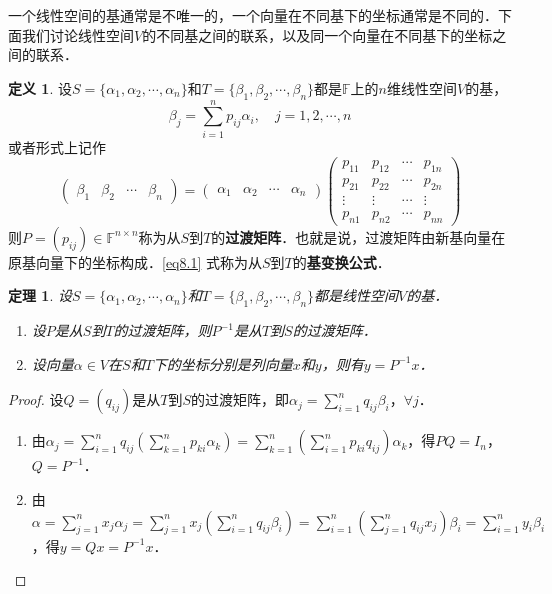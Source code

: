 \documentclass[a4paper,fontset=windows]{ctexbook}
\newtheorem{theorem}{定理}[chapter]
\theoremstyle{definition}
\newtheorem{definition}{定义}[chapter]
\begin{document}
一个线性空间的基通常是不唯一的，一个向量在不同基下的坐标通常是不同的．下面我们讨论线性空间$V$的不同基之间的联系，以及同一个向量在不同基下的坐标之间的联系．

\begin{definition}
设$S=\{\alpha_1,\alpha_2,\cdots,\alpha_n\}$和$T=\{\beta_1,\beta_2,\cdots,\beta_n\}$都是$\mathbb{F}$上的$n$维线性空间$V$的基，
$$\beta_j=\sum_{i=1}^np_{ij}\alpha_i,\quad j=1,2,\cdots,n$$
或者形式上记作
\begin{equation}\label{eq8.1}
\begin{pmatrix}\beta_1&\beta_2&\cdots&\beta_n\end{pmatrix}=\begin{pmatrix}\alpha_1&\alpha_2&\cdots&\alpha_n\end{pmatrix}\begin{pmatrix}p_{11}&p_{12}&\cdots&p_{1n} \\ p_{21}&p_{22}&\cdots&p_{2n} \\ \vdots&\vdots&\cdots&\vdots \\ p_{n1}&p_{n2}&\cdots&p_{nn}\end{pmatrix}
\end{equation}
则$P=(p_{ij})\in\mathbb{F}^{n\times n}$称为从$S$到$T$的{\bf 过渡矩阵}．也就是说，过渡矩阵由新基向量在原基向量下的坐标构成．\eqref{eq8.1} 式称为从$S$到$T$的{\bf 基变换公式}．
\end{definition}

\begin{theorem}
设$S=\{\alpha_1,\alpha_2,\cdots,\alpha_n\}$和$T=\{\beta_1,\beta_2,\cdots,\beta_n\}$都是线性空间$V$的基．
\begin{enumerate}
\item 设$P$是从$S$到$T$的过渡矩阵，则$P^{-1}$是从$T$到$S$的过渡矩阵．

\item 设向量$\alpha\in V$在$S$和$T$下的坐标分别是列向量$x$和$y$，则有$y=P^{-1}x$．
\end{enumerate}
\end{theorem}

\begin{proof}
设$Q=(q_{ij})$是从$T$到$S$的过渡矩阵，即$\alpha_j=\sum\limits_{i=1}^nq_{ij}\beta_i$，$\forall j$．
\begin{enumerate}
\item 由$\alpha_j=\sum\limits_{i=1}^nq_{ij}\left(\sum\limits_{k=1}^np_{ki}\alpha_k\right)=\sum\limits_{k=1}^n\left(\sum\limits_{i=1}^np_{ki}q_{ij}\right)\alpha_k$，得$PQ=I_n$，$Q=P^{-1}$．

\item 由$\alpha=\sum\limits_{j=1}^nx_j\alpha_j=\sum\limits_{j=1}^nx_j\left(\sum\limits_{i=1}^nq_{ij}\beta_i\right)=\sum\limits_{i=1}^n\left(\sum\limits_{j=1}^nq_{ij}x_j\right)\beta_i=\sum\limits_{i=1}^ny_i\beta_i$，得$y=Qx=P^{-1}x$．\qedhere
\end{enumerate}
\end{proof}
\end{document}
